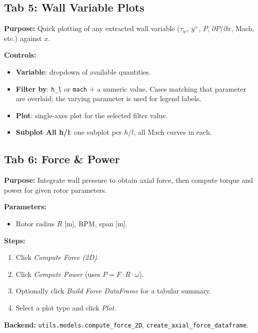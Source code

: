 \documentclass[11pt,letterpaper]{article}
\begin{document}
\subsection{Tab 5: Wall Variable Plots}

\textbf{Purpose:} Quick plotting of any extracted wall variable ($\tau_w$,
$y^+$, $P$, $\partial P/\partial x$, Mach, etc.) against $x$.

\textbf{Controls:}
\begin{itemize}
  \item \textbf{Variable}: dropdown of available quantities.
  \item \textbf{Filter by}: \texttt{h\_l} or \texttt{mach} $+$ a numeric
        value.  Cases matching that parameter are overlaid; the varying
        parameter is used for legend labels.
  \item \textbf{Plot}: single-axes plot for the selected filter value.
  \item \textbf{Subplot All h/l}: one subplot per $h/l$, all Mach curves in
        each.
\end{itemize}

\subsection{Tab 6: Force \& Power}

\textbf{Purpose:} Integrate wall pressure to obtain axial force, then compute
torque and power for given rotor parameters.

\textbf{Parameters:}
\begin{itemize}
  \item Rotor radius $R$ [m], RPM, span [m].
\end{itemize}

\textbf{Steps:}
\begin{enumerate}
  \item Click \emph{Compute Force (2D)}.
  \item Click \emph{Compute Power} (uses $P = F \cdot R \cdot \omega$).
  \item Optionally click \emph{Build Force DataFrame} for a tabular summary.
  \item Select a plot type and click \emph{Plot}.
\end{enumerate}

\textbf{Backend:} \texttt{utils.models.compute\_force\_2D},
\texttt{create\_axial\_force\_dataframe}.
\end{document}
